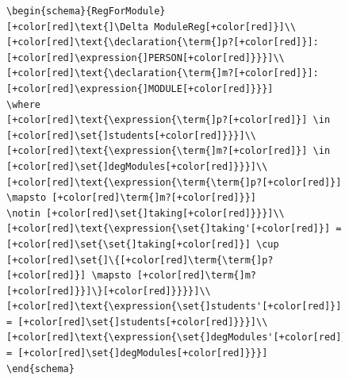 \begin{figure}[H]
\begin{minipage}{0.45\textwidth}
\begin{tiny}
\begin{BVerbatim}[commandchars=+\[\]]
\begin{schema}{RegForModule}
[+color[red]\text{]\Delta ModuleReg[+color[red]}]\\
[+color[red]\text{\declaration{\term{]p?[+color[red]}]: [+color[red]\expression{]PERSON[+color[red]}}}]\\
[+color[red]\text{\declaration{\term{]m?[+color[red]}]: [+color[red]\expression{]MODULE[+color[red]}}}]
\where
[+color[red]\text{\expression{\term{]p?[+color[red]}] \in [+color[red]\set{]students[+color[red]}}}]\\
[+color[red]\text{\expression{\term{]m?[+color[red]}] \in [+color[red]\set{]degModules[+color[red]}}}]\\
[+color[red]\text{\expression{\term{\term{]p?[+color[red]}] \mapsto [+color[red]\term{]m?[+color[red]}}]
\notin [+color[red]\set{]taking[+color[red]}}}]\\
[+color[red]\text{\expression{\set{]taking'[+color[red]}] = [+color[red]\set{\set{]taking[+color[red]}] \cup
[+color[red]\set{]\{[+color[red]\term{\term{]p?[+color[red]}] \mapsto [+color[red]\term{]m?[+color[red]}}]\}[+color[red]}}}}]\\
[+color[red]\text{\expression{\set{]students'[+color[red]}] = [+color[red]\set{]students[+color[red]}}}]\\
[+color[red]\text{\expression{\set{]degModules'[+color[red]}] = [+color[red]\set{]degModules[+color[red]}}}]
\end{schema}


\end{BVerbatim}
\end{tiny}
\end{minipage}
\end{figure}
